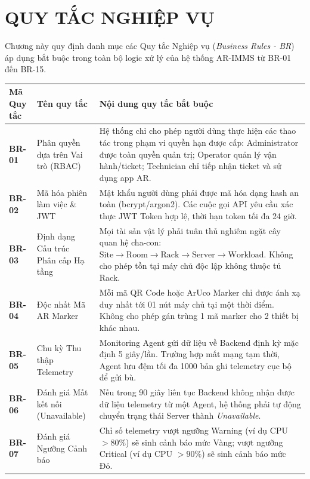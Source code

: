 \chapter{QUY TẮC NGHIỆP VỤ}

Chương này quy định danh mục các Quy tắc Nghiệp vụ (\textit{Business Rules - BR}) áp dụng bắt buộc trong toàn bộ logic xử lý của hệ thống AR-IMMS từ BR-01 đến BR-15.

\begin{longtable}{|p{2.5cm}|p{4.5cm}|p{7.5cm}|}
\hline
\textbf{Mã Quy tắc} & \textbf{Tên quy tắc} & \textbf{Nội dung quy tắc bắt buộc} \\ \hline
\endhead
\textbf{BR-01} & Phân quyền dựa trên Vai trò (RBAC) & Hệ thống chỉ cho phép người dùng thực hiện các thao tác trong phạm vi quyền hạn được cấp: Administrator được toàn quyền quản trị; Operator quản lý vận hành/ticket; Technician chỉ tiếp nhận ticket và sử dụng app AR. \\ \hline
\textbf{BR-02} & Mã hóa phiên làm việc \& JWT & Mật khẩu người dùng phải được mã hóa dạng hash an toàn (bcrypt/argon2). Các cuộc gọi API yêu cầu xác thực JWT Token hợp lệ, thời hạn token tối đa 24 giờ. \\ \hline
\textbf{BR-03} & Định dạng Cấu trúc Phân cấp Hạ tầng & Mọi tài sản vật lý phải tuân thủ nghiêm ngặt cây quan hệ cha-con: $\text{Site} \rightarrow \text{Room} \rightarrow \text{Rack} \rightarrow \text{Server} \rightarrow \text{Workload}$. Không cho phép tồn tại máy chủ độc lập không thuộc tủ Rack. \\ \hline
\textbf{BR-04} & Độc nhất Mã AR Marker & Mỗi mã QR Code hoặc ArUco Marker chỉ được ánh xạ duy nhất tới 01 nút máy chủ tại một thời điểm. Không cho phép gán trùng 1 mã marker cho 2 thiết bị khác nhau. \\ \hline
\textbf{BR-05} & Chu kỳ Thu thập Telemetry & Monitoring Agent gửi dữ liệu về Backend định kỳ mặc định 5 giây/lần. Trường hợp mất mạng tạm thời, Agent lưu đệm tối đa 1000 bản ghi telemetry cục bộ để gửi bù. \\ \hline
\textbf{BR-06} & Đánh giá Mất kết nối (Unavailable) & Nếu trong 90 giây liên tục Backend không nhận được dữ liệu telemetry từ một Agent, hệ thống phải tự động chuyển trạng thái Server thành \textit{Unavailable}. \\ \hline
\textbf{BR-07} & Đánh giá Ngưỡng Cảnh báo & Chỉ số telemetry vượt ngưỡng Warning (ví dụ CPU $> 80\%$) sẽ sinh cảnh báo mức Vàng; vượt ngưỡng Critical (ví dụ CPU $> 90\%$) sẽ sinh cảnh báo mức Đỏ. \\ \hline

\end{longtable}
